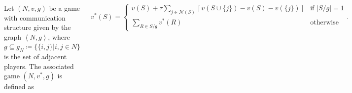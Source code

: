 \documentclass[12pt, a2paper, portrait]{tikzposter}
\begin{document}
\begin{columns}
{		Let $(N, v, g)$ be a game with communication structure given by the graph $\left< N, g \right>$, where
		$g \subseteq g_N \coloneqq \{ \{i, j\} | i, j \in N \}$ is the set of adjacent players. The
		associated game $(N, v^*, g)$ is defined as

		\begin{equation}
			v^*(S) =
			\begin{cases}
				v(S) + \tau \sum_{j \in \mathcal{N}(S)} \left[ v(S \cup \{j\}) - v(S) - v(\{j\}) \right] & \text{if } |S/g| = 1 \\
				\sum_{R \in S/g} v^*(R)                                                                  & \text{otherwise}
			\end{cases}
			.
		\end{equation}
	}
\end{columns}

% 
% 
\end{document}

